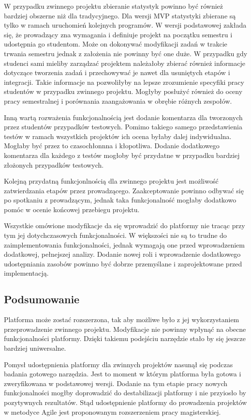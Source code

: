 W przypadku zwinnego projektu zbieranie statystyk powinno być również bardziej obszerne niż dla tradycyjnego.
Dla wersji MVP statystyki zbierane są tylko w ramach uruchomień kolejnych programów.
W wersji podstawowej zakłada się, że prowadzący zna wymagania i definiuje projekt na początku semestru i udostępnia go studentom.
Może on dokonywać modyfikacji zadań w trakcie trwania semestru jednak z założenia nie powinny być one duże.
W przypadku gdy studenci sami mieliby zarządzać projektem należałoby zbierać również informacje dotyczące tworzenia zadań i przechowywać je nawet dla usuniętych etapów i integracji.
Takie informacje na pozwoliłyby na lepsze zrozumienie specyfiki pracy studentów w przypadku zwinnego projektu.
Mogłyby posłużyć również do oceny pracy semestralnej i porównania zaangażowania w obrębie różnych zespołów.

Inną wartą rozważenia funkcjonalnością jest dodanie komentarza dla tworzonych przez studentów przypadków testowych.
Pomimo takiego samego przedstawienia testów w ramach wszystkich projektów ich ocena byłaby dalej indywidualna.
Mogłaby być przez to czasochłonnna i kłopotliwa.
Dodanie dodatkowego komentarza dla każdego z testów mogłoby być przydatne w przypadku bardziej złożonych przypadków testowych.

Kolejną przydatną funkcjonlnością dla zwinnego projektu jest możliwość zatwierdzania etapów przez prowadzącego.
Zaakceptowanie powinno odbywać się po spotkaniu z prowadzącym, jednak taka funkcjonalność mogłaby dodatkowo pomóc w ocenie końcowej przebiegu projektu.

Wszystkie omówione modyfikacje da się wprowadzić do platformy nie tracąc przy tym jej dotychczasowych funkcjonalności.
W większości nie są to trudne do zaimplementowania funkcjonalności, jednak wymagają one przed wprowadzeniem dodatkowej, pełnejszej analizy.
Dodanie nowej roli i wprowadzenie dodatkowego udostępniania zasobów powinno być dobrze przemyślane i zaprojektowane przed implementacją.

\subsection{Podsumowanie}

Platforma może zostać rozszerzona, tak aby możliwe było z jej wykorzystaniem przeprowadzenie zwinnego projektu.
Modyfikacje nie powinny wpłynąć na obecne funkcjonalności platformy.
Dzięki takiemu podejściu narzędzie stało by się jeszcze bardziej uniwersalne.

Pomysł udostępnienia platformy dla zwinnych projektów nasunął się podczas badania gotowego narzędzia.
Jest to moment w którym platforma była gotowa i zweryfikowana w podstawowej wersji.
Dodanie na tym etapie pracy nowych funkcjonalności mogłby doprowadzić do destabilizacji platformy i nie przyiosło by pozytywnych rezultatów.
Stąd udostępnienie platformy do prowadzenia projektów w metodyce Agile jest proponowanym rozszerzeniem pracy magisterskiej.


